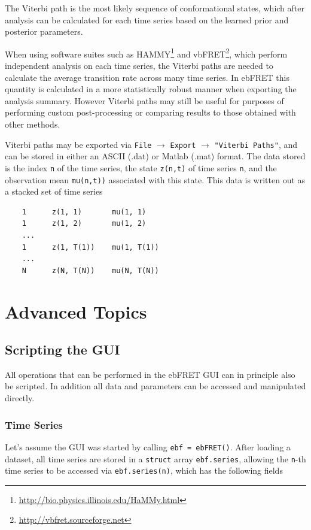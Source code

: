 \documentclass[12pt,article,oldfontcommands]{memoir}
\begin{document}
The Viterbi path is the most likely sequence of conformational states, which after analysis can be calculated for each time series based on the learned prior and posterior parameters. 

When using software suites such as HAMMY\footnote{\url{http://bio.physics.illinois.edu/HaMMy.html}} and vbFRET\footnote{\url{http://vbfret.sourceforge.net}}, which perform independent analysis on each time series, the Viterbi paths are needed to calculate the average transition rate across many time series. In ebFRET this quantity is calculated in a more statistically robust manner when exporting the analysis summary. However Viterbi paths may still be useful for purposes of performing custom post-processing or comparing results to those obtained with other methods. 

Viterbi paths may be exported via \texttt{File} $\to$ \texttt{Export} $\to$ \texttt{"Viterbi Paths"}, and can be stored in either an ASCII (.dat) or Matlab (.mat) format. The data stored is the index \texttt{n} of the time series, the state \texttt{z(n,t)} of time series \texttt{n}, and the observation mean \texttt{mu(n,t))} associated  with this state. This data is written out as a stacked set of time series

\begin{verbatim}
    1      z(1, 1)       mu(1, 1)
    1      z(1, 2)       mu(1, 2)
    ...
    1      z(1, T(1))    mu(1, T(1))
    ...
    N      z(N, T(N))    mu(N, T(N))
\end{verbatim}

\section{Advanced Topics}
\label{sec:advanced}

\subsection{Scripting the GUI}

All operations that can be performed in the ebFRET GUI can in principle also be scripted. In addition all data and parameters can be accessed and manipulated directly. 

\subsubsection{Time Series}

Let's assume the GUI was started by calling \texttt{ebf = ebFRET()}. After loading a dataset, all time series are stored in a \texttt{struct} array \texttt{ebf.series}, allowing the \texttt{n}-th time series to be accessed via \texttt{ebf.series(n)}, which has the following fields
\end{document}
